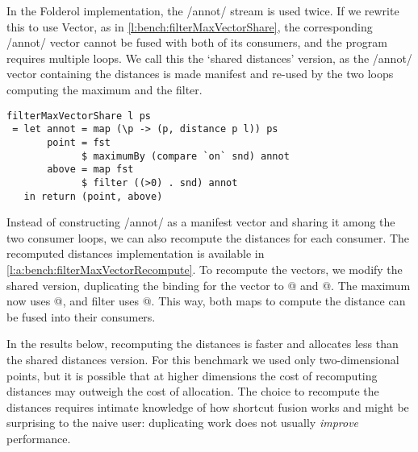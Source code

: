 In the Folderol implementation, the \Hs/annot/ stream is used twice.
If we rewrite this to use Vector, as in \cref{l:bench:filterMaxVectorShare}, the corresponding \Hs/annot/ vector cannot be fused with both of its consumers, and the program requires multiple loops.
We call this the `shared distances' version, as the \Hs/annot/ vector containing the distances is made manifest and re-used by the two loops computing the maximum and the filter.


\begin{lstlisting}[float,label=l:bench:filterMaxVectorShare,caption=Vector shared distances implementation of filterMax]
filterMaxVectorShare l ps
 = let annot = map (\p -> (p, distance p l)) ps
       point = fst
             $ maximumBy (compare `on` snd) annot
       above = map fst
             $ filter ((>0) . snd) annot
   in return (point, above)
\end{lstlisting}


Instead of constructing \Hs/annot/ as a manifest vector and sharing it among the two consumer loops, we can also recompute the distances for each consumer.
The recomputed distances implementation is available in \cref{l:a:bench:filterMaxVectorRecompute}.
To recompute the vectors, we modify the shared version, duplicating the binding for the \Hs@annot@ vector to @ and @. The maximum now uses @, and filter uses @.
This way, both maps to compute the distance can be fused into their consumers.

In the results below, recomputing the distances is faster and allocates less than the shared distances version.
For this benchmark we used only two-dimensional points, but it is possible that at higher dimensions the cost of recomputing distances may outweigh the cost of allocation.
The choice to recompute the distances requires intimate knowledge of how shortcut fusion works and might be surprising to the naive user: duplicating work does not usually \emph{improve} performance.

